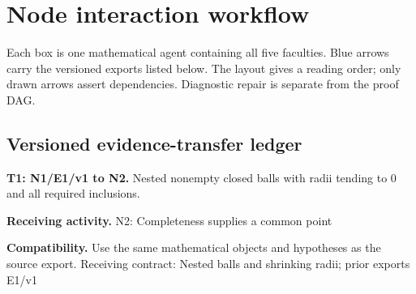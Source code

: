 \documentclass[preprint,12pt,aps,pra,showkeys,amsmath,amssymb,superscriptaddress,floatfix]{revtex4-2}
\theoremstyle{definition}
\theoremstyle{remark}
\newcommand{\field}[2]{\par\smallskip\noindent\textbf{#1.} #2\par}
\begin{document}
\clearpage\section{Node interaction workflow}

\begin{center}\end{center}

Each box is one mathematical agent containing all five faculties. Blue
arrows carry the versioned exports listed below. The layout gives a
reading order; only drawn arrows assert dependencies. Diagnostic repair
is separate from the proof DAG.

\subsection{Versioned evidence-transfer ledger}

\begingroup\small\linespread{1.05}\selectfont

\field{T1: N1/E1/v1 to N2}{Nested nonempty closed balls with radii tending to 0 and all required
inclusions.}

\field{Receiving activity}{N2: Completeness supplies a common point}

\field{Compatibility}{Use the same mathematical objects and hypotheses as the source export.
Receiving contract: Nested balls and shrinking radii; prior exports
E1/v1}
\end{document}
